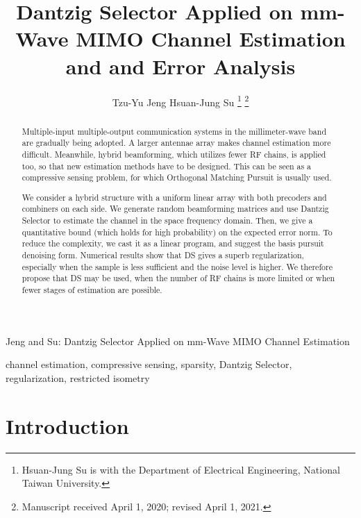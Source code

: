 \documentclass[journal]{IEEEtran}
\newcounter {result}
\begin{document}
\title{Dantzig Selector Applied on mm-Wave MIMO Channel Estimation and and Error Analysis}

\author{Tzu-Yu Jeng
        Hsuan-Jung Su%
\thanks{Hsuan-Jung Su is with the Department
of Electrical Engineering, National Taiwan University.}
\thanks{Manuscript received April 1, 2020; revised April 1, 2021.}}

%
{Jeng and Su: Dantzig Selector Applied on mm-Wave MIMO Channel Estimation}



\maketitle

\begin{abstract}
Multiple-input multiple-output communication systems in the millimeter-wave band are gradually being adopted.
A larger antennae array makes channel estimation more difficult.
Meanwhile, hybrid beamforming, which utilizes fewer RF chains, is applied too, so that new estimation methods have to be designed.
This can be seen as a compressive sensing problem, for which Orthogonal Matching Pursuit is usually used.

We consider a hybrid structure with a uniform linear array with both precoders and combiners on each side.
We generate random beamforming matrices and use Dantzig Selector to estimate the channel in the space frequency domain.
Then, we give a quantitative bound (which holds for high probability) on the expected error norm.
To reduce the complexity, we cast it as a linear program, and suggest the basis pursuit denoising form.
Numerical results show that DS gives a superb regularization, especially when the sample is less sufficient and the noise level is higher.
We therefore propose that DS may be used, when the number of RF chains is more limited or when fewer stages of estimation are possible.
\end{abstract}

\begin{IEEEkeywords}
channel estimation, compressive sensing, sparsity, Dantzig Selector, regularization, restricted isometry
\end{IEEEkeywords}



\section{Introduction}
\end{document}

